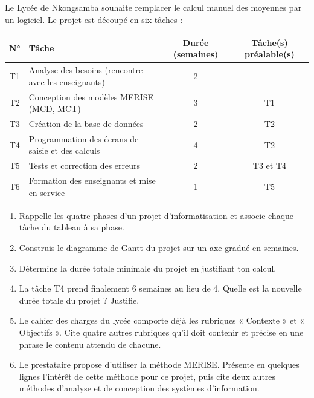 \documentclass[11pt]{article}
\begin{document}
\begin{exercice}
Le Lycée de Nkongsamba souhaite remplacer le calcul manuel des moyennes par un logiciel. Le projet est découpé en six tâches :
\begin{center}
\begin{tabularx}{\linewidth}{|c|X|c|c|}
\hline
\rowcolor{popblueL} \textbf{N°} & \textbf{Tâche} & \textbf{Durée (semaines)} & \textbf{Tâche(s) préalable(s)} \\
\hline
T1 & Analyse des besoins (rencontre avec les enseignants) & 2 & — \\
\hline
T2 & Conception des modèles MERISE (MCD, MCT) & 3 & T1 \\
\hline
T3 & Création de la base de données & 2 & T2 \\
\hline
T4 & Programmation des écrans de saisie et des calculs & 4 & T2 \\
\hline
T5 & Tests et correction des erreurs & 2 & T3 et T4 \\
\hline
T6 & Formation des enseignants et mise en service & 1 & T5 \\
\hline
\end{tabularx}
\end{center}
\begin{enumerate}
  \item Rappelle les quatre phases d'un projet d'informatisation et associe chaque tâche du tableau à sa phase.
  \item Construis le diagramme de Gantt du projet sur un axe gradué en semaines.
  \item Détermine la durée totale minimale du projet en justifiant ton calcul.
  \item La tâche T4 prend finalement 6 semaines au lieu de 4. Quelle est la nouvelle durée totale du projet ? Justifie.
  \item Le cahier des charges du lycée comporte déjà les rubriques « Contexte » et « Objectifs ». Cite quatre autres rubriques qu'il doit contenir et précise en une phrase le contenu attendu de chacune.
  \item Le prestataire propose d'utiliser la méthode MERISE. Présente en quelques lignes l'intérêt de cette méthode pour ce projet, puis cite deux autres méthodes d'analyse et de conception des systèmes d'information.
\end{enumerate}
\end{exercice}
\end{document}
